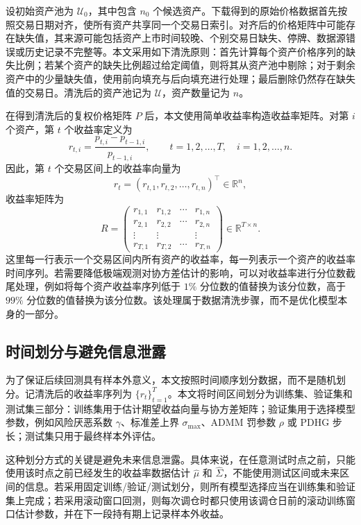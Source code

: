 \documentclass[UTF8,12pt]{ctexart}
\begin{document}
设初始资产池为 $\mathcal{U}_0$，其中包含 $n_0$ 个候选资产。下载得到的原始价格数据首先按照交易日期对齐，使所有资产共享同一个交易日索引。对齐后的价格矩阵中可能存在缺失值，其来源可能包括资产上市时间较晚、个别交易日缺失、停牌、数据源错误或历史记录不完整等。本文采用如下清洗原则：首先计算每个资产价格序列的缺失比例；若某个资产的缺失比例超过给定阈值，则将其从资产池中剔除；对于剩余资产中的少量缺失值，使用前向填充与后向填充进行处理；最后删除仍然存在缺失值的交易日。清洗后的资产池记为 $\mathcal{U}$，资产数量记为 $n$。

在得到清洗后的复权价格矩阵 $P$ 后，本文使用简单收益率构造收益率矩阵。对第 $i$ 个资产，第 $t$ 个收益率定义为
\[
r_{t,i}=\frac{p_{t,i}-p_{t-1,i}}{p_{t-1,i}},\qquad t=1,2,\ldots,T,\quad i=1,2,\ldots,n.
\]
因此，第 $t$ 个交易区间上的收益率向量为
\[
r_t=(r_{t,1},r_{t,2},\ldots,r_{t,n})^\top\in\mathbb{R}^n,
\]
收益率矩阵为
\[
R=
\begin{pmatrix}
r_{1,1} & r_{1,2} & \cdots & r_{1,n}\\
r_{2,1} & r_{2,2} & \cdots & r_{2,n}\\
\vdots & \vdots & & \vdots\\
r_{T,1} & r_{T,2} & \cdots & r_{T,n}
\end{pmatrix}\in\mathbb{R}^{T\times n}.
\]
这里每一行表示一个交易区间内所有资产的收益率，每一列表示一个资产的收益率时间序列。若需要降低极端观测对协方差估计的影响，可以对收益率进行分位数截尾处理，例如将每个资产收益率序列低于 $1\%$ 分位数的值替换为该分位数，高于 $99\%$ 分位数的值替换为该分位数。该处理属于数据清洗步骤，而不是优化模型本身的一部分。

\subsection{时间划分与避免信息泄露}

为了保证后续回测具有样本外意义，本文按照时间顺序划分数据，而不是随机划分。记清洗后的收益率序列为 $\{r_t\}_{t=1}^T$。本文将时间区间划分为训练集、验证集和测试集三部分：训练集用于估计期望收益向量与协方差矩阵；验证集用于选择模型参数，例如风险厌恶系数 $\gamma$、标准差上界 $\sigma_{\max}$、ADMM 罚参数 $\rho$ 或 PDHG 步长；测试集只用于最终样本外评估。

这种划分方式的关键是避免未来信息泄露。具体来说，在任意测试时点之前，只能使用该时点之前已经发生的收益率数据估计 $\hat\mu$ 和 $\hat\Sigma$，不能使用测试区间或未来区间的信息。若采用固定训练/验证/测试划分，则所有模型选择应当在训练集和验证集上完成；若采用滚动窗口回测，则每次调仓时都只使用该调仓日前的滚动训练窗口估计参数，并在下一段持有期上记录样本外收益。
\end{document}
